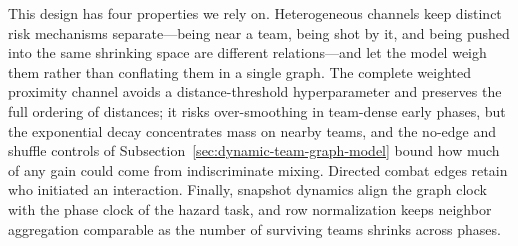 This design has four properties we rely on. Heterogeneous channels keep
distinct risk mechanisms separate---being near a team, being shot by it, and
being pushed into the same shrinking space are different relations---and let
the model weigh them rather than conflating them in a single graph. The
complete weighted proximity channel avoids a distance-threshold
hyperparameter and preserves the full ordering of distances; it risks
over-smoothing in team-dense early phases, but the exponential decay
concentrates mass on nearby teams, and the no-edge and shuffle controls of
Subsection~\ref{sec:dynamic-team-graph-model} bound how much of any gain
could come from indiscriminate mixing. Directed combat edges retain who
initiated an interaction. Finally, snapshot dynamics align the graph clock
with the phase clock of the hazard task, and row normalization keeps neighbor
aggregation comparable as the number of surviving teams shrinks across
phases.
